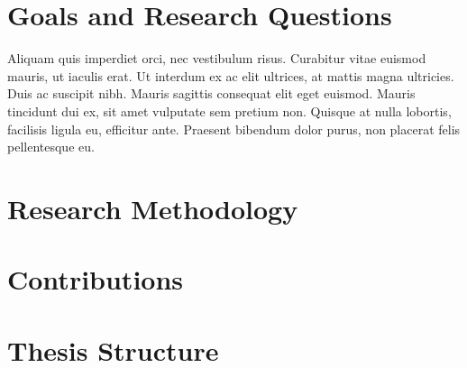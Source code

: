 \section{Goals and Research Questions} \label{goals_and_research_questions}

Aliquam quis imperdiet orci, nec vestibulum risus. Curabitur vitae euismod mauris, ut iaculis erat. Ut interdum ex ac elit ultrices, at mattis magna ultricies. Duis ac suscipit nibh. Mauris sagittis consequat elit eget euismod. Mauris tincidunt dui ex, sit amet vulputate sem pretium non. Quisque at nulla lobortis, facilisis ligula eu, efficitur ante. Praesent bibendum dolor purus, non placerat felis pellentesque eu.

\section{Research Methodology}

\section{Contributions}

\section{Thesis Structure}